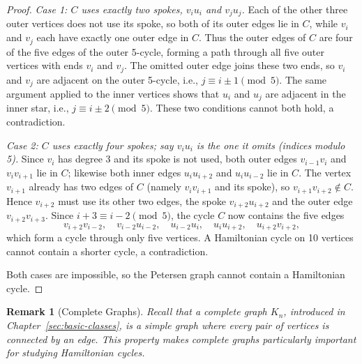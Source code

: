 \documentclass{article}
\newtheorem{remark}{Remark}
\theoremstyle{definition}
\begin{document}
\begin{proof}
\emph{Case 1: $C$ uses exactly two spokes, $v_iu_i$ and $v_ju_j$.} Each of the other three outer vertices does not use its spoke, so both of its outer edges lie in $C$, while $v_i$ and $v_j$ each have exactly one outer edge in $C$. Thus the outer edges of $C$ are four of the five edges of the outer 5-cycle, forming a path through all five outer vertices with ends $v_i$ and $v_j$. The omitted outer edge joins these two ends, so $v_i$ and $v_j$ are adjacent on the outer 5-cycle, i.e., $j \equiv i \pm 1 \pmod 5$. The same argument applied to the inner vertices shows that $u_i$ and $u_j$ are adjacent in the inner star, i.e., $j \equiv i \pm 2 \pmod 5$. These two conditions cannot both hold, a contradiction.

\emph{Case 2: $C$ uses exactly four spokes; say $v_iu_i$ is the one it omits (indices modulo 5).} Since $v_i$ has degree 3 and its spoke is not used, both outer edges $v_{i-1}v_i$ and $v_iv_{i+1}$ lie in $C$; likewise both inner edges $u_iu_{i+2}$ and $u_iu_{i-2}$ lie in $C$. The vertex $v_{i+1}$ already has two edges of $C$ (namely $v_iv_{i+1}$ and its spoke), so $v_{i+1}v_{i+2} \notin C$. Hence $v_{i+2}$ must use its other two edges, the spoke $v_{i+2}u_{i+2}$ and the outer edge $v_{i+2}v_{i+3}$. Since $i+3 \equiv i-2 \pmod 5$, the cycle $C$ now contains the five edges
\[
v_{i+2}v_{i-2}, \quad v_{i-2}u_{i-2}, \quad u_{i-2}u_i, \quad u_iu_{i+2}, \quad u_{i+2}v_{i+2},
\]
which form a cycle through only five vertices. A Hamiltonian cycle on 10 vertices cannot contain a shorter cycle, a contradiction.

Both cases are impossible, so the Petersen graph cannot contain a Hamiltonian cycle.
\end{proof}

\begin{remark}[Complete Graphs]
Recall that a complete graph $K_n$, introduced in Chapter~\ref{sec:basic-classes}, is a simple graph where every pair of vertices is connected by an edge. This property makes complete graphs particularly important for studying Hamiltonian cycles.
\end{remark}
\end{document}
